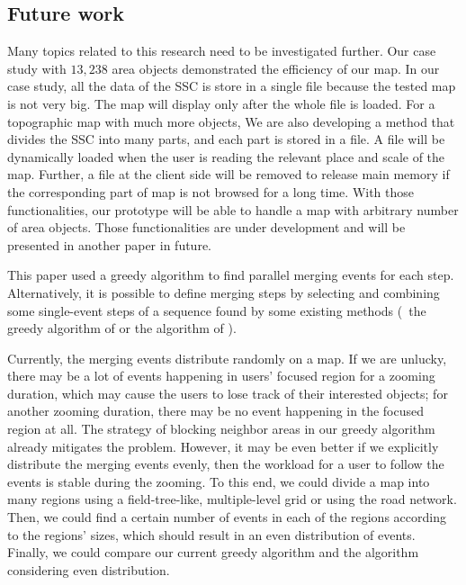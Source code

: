 \documentclass[]{interact}
\begin{document}
\subsection{Future work}

Many topics related to this research need to be investigated further.
Our case study with $13{,}238$ area objects 
demonstrated the efficiency of our map.
In our case study, all the data of the SSC is store in a single file
because the tested map is not very big.
The map will display only after the whole file is loaded.
For a topographic map with much more objects,
We are also developing a method that divides the SSC into many parts, 
and each part is stored in a file.
A file will be dynamically loaded when the user is reading the relevant place and scale of the map.
Further, a file at the client side will be removed to release main memory
if the corresponding part of map is not browsed for a long time. 
With those functionalities, our prototype will be able to handle 
a map with arbitrary number of area objects.
Those functionalities are under development 
and will be presented in another paper in future.






This paper used a greedy algorithm 
to find parallel merging events for each step.
Alternatively, it is possible to define merging steps 
by selecting and combining some single-event steps of a sequence found 
by some existing methods
(\eg~the greedy algorithm of \citet{vanOosterom2005}
or the \Astar algorithm of \citet{Peng2020AreaAgg}).

Currently, the merging events distribute randomly on a map.
If we are unlucky, there may be a lot of events 
happening in users' focused region for a zooming duration,
which may cause the users to lose track of their interested objects;
for another zooming duration, 
there may be no event happening in the focused region at all.
The strategy of blocking neighbor areas in our greedy algorithm 
already mitigates the problem.
However, it may be even better if 
we explicitly distribute the merging events evenly, 
then the workload for a user to follow the events is stable during the zooming.
To this end, we could divide a map into many regions 
using a field-tree-like, multiple-level grid \citep{vanPutten1998NewGAP}
or using the road network.
Then, we could find a certain number of events in each of the regions 
according to the regions' sizes,
which should result in an even distribution of events.
Finally, we could compare our current greedy algorithm and 
the algorithm considering even distribution.
\end{document}
